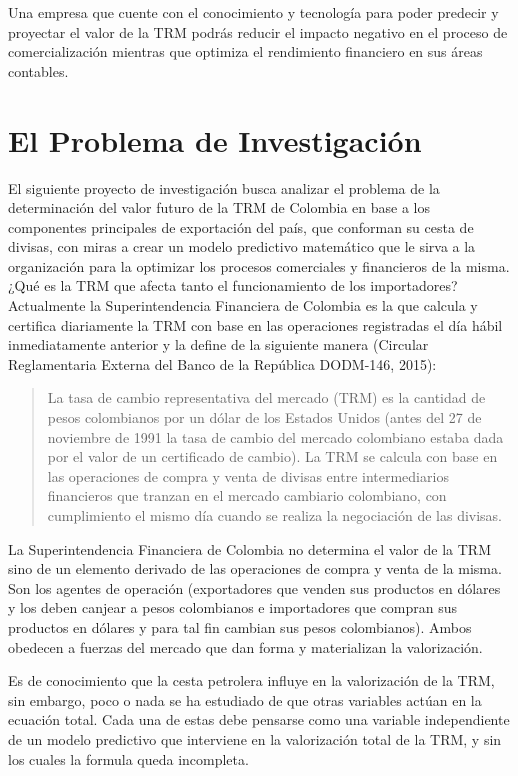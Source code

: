 \documentclass[letterpaper, spanish, 11pt]{report}
\begin{document}
Una empresa que cuente con el conocimiento y tecnología para poder predecir y proyectar el valor de la TRM podrás reducir el impacto negativo en el proceso de comercialización mientras que optimiza el rendimiento financiero en sus áreas contables. 

\section{El Problema de Investigación}
El siguiente proyecto de investigación busca analizar el problema de la determinación del valor futuro de la TRM de Colombia en base a los componentes principales de exportación del país, que conforman su cesta de divisas, con miras a crear un modelo predictivo matemático que le sirva a la organización para la optimizar los procesos comerciales y financieros de la misma. ¿Qué es la TRM que afecta tanto el funcionamiento de los importadores? Actualmente la Superintendencia Financiera de Colombia es la que calcula y certifica diariamente la TRM con base en las operaciones registradas el día hábil inmediatamente anterior y la define de la siguiente manera (Circular Reglamentaria Externa del Banco de la República DODM-146, 2015):

\begin{quotation}
	La tasa de cambio representativa del mercado (TRM) es la cantidad de pesos colombianos por un dólar de los Estados Unidos (antes del 27 de noviembre de 1991 la tasa de cambio del mercado colombiano estaba dada por el valor de un certificado de cambio). La TRM se calcula con base en las operaciones de compra y venta de divisas entre intermediarios financieros que tranzan en el mercado cambiario colombiano, con cumplimiento el mismo día cuando se realiza la negociación de las divisas.
\end{quotation}

La Superintendencia Financiera de Colombia no determina el valor de la TRM sino de un elemento derivado de las operaciones de compra y venta de la misma. Son los agentes de operación (exportadores que venden sus productos en dólares y los deben canjear a pesos colombianos e importadores que compran sus productos en dólares y para tal fin cambian sus pesos colombianos). Ambos obedecen a fuerzas del mercado que dan forma y materializan la valorización. 

Es de conocimiento que la cesta petrolera influye en la valorización de la TRM, sin embargo, poco o nada se ha estudiado de que otras variables actúan en la ecuación total. Cada una de estas debe pensarse como una variable independiente de un modelo predictivo que interviene en la valorización total de la TRM, y sin los cuales la formula queda incompleta.
\end{document}
